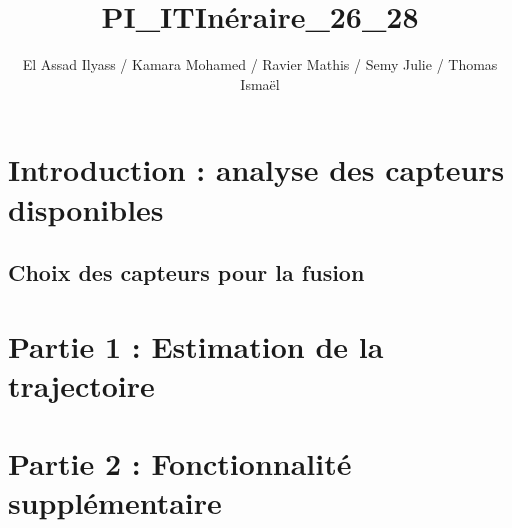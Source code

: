 

\usepackage[utf8]{inputenc}
\usepackage[T1]{fontenc}
\usepackage[french]{babel}
\usepackage{graphicx}
\usepackage{svg}
\usepackage{url}
\usepackage[
  left=2cm,
  right=2cm,
  top=2.5cm,
  bottom=2.5cm
]{geometry}
\usepackage{amsmath}
\usepackage[colorlinks=true, allcolors=blue]{hyperref}

\title{PI\_ITInéraire\_26\_28}
\author{El Assad Ilyass / Kamara Mohamed / Ravier Mathis / Semy Julie / Thomas Ismaël}


\maketitle
\tableofcontents

\newpage
\section{Introduction : analyse des capteurs disponibles}

\subsection{Choix des capteurs pour la fusion}


\section{Partie 1 : Estimation de la trajectoire}


\section{Partie 2 : Fonctionnalité supplémentaire}



